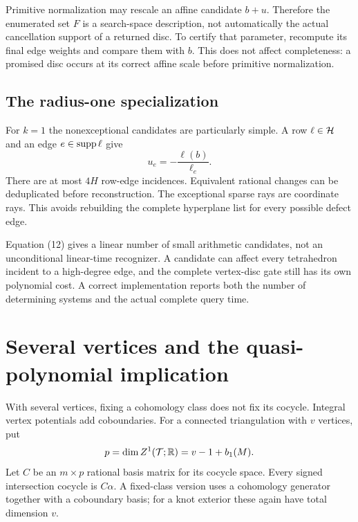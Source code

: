 Primitive normalization may rescale an affine candidate $b+u$. Therefore
the enumerated set $F$ is a search-space description, not automatically
the actual cancellation support of a returned disc. To certify that
parameter, recompute its final edge weights and compare them with $b$.
This does not affect completeness: a promised disc occurs at its correct
affine scale before primitive normalization.

\subsection{The radius-one specialization}

For $k=1$ the nonexceptional candidates are particularly simple. A row
$\ell\in\mathcal H$ and an edge $e\in\operatorname{supp}\ell$ give
\[
                     u_e=-\frac{\ell(b)}{\ell_e}.          \tag{12}\label{eq:oneedge}
\]
There are at most $4H$ row-edge incidences. Equivalent rational changes
can be deduplicated before reconstruction. The exceptional sparse rays
are coordinate rays. This avoids rebuilding the complete hyperplane list
for every possible defect edge.

Equation (12) gives a linear number of small arithmetic candidates, not
an unconditional linear-time recognizer. A candidate can affect every
tetrahedron incident to a high-degree edge, and the complete vertex-disc gate
still has its own polynomial cost. A correct implementation reports both
the number of determining systems and the actual complete query time.

\section{Several vertices and the quasi-polynomial implication}
\label{sec:multi}

With several vertices, fixing a cohomology class does not fix its cocycle.
Integral vertex potentials add coboundaries. For a connected triangulation
with $v$ vertices, put
\[
                   p=\dim Z^1(\mathcal T;\mathbb R)=v-1+b_1(M).
\]
Let $C$ be an $m\times p$ rational basis matrix for its cocycle space.
Every signed intersection cocycle is $C\alpha$. A fixed-class version
uses a cohomology generator together with a coboundary basis; for a knot
exterior these again have total dimension $v$.

